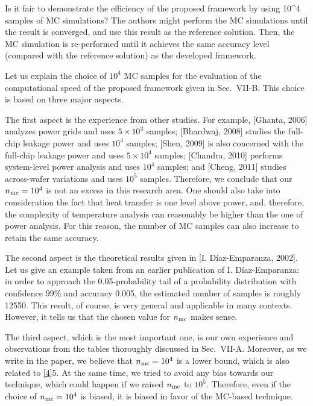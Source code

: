 \begin{reviewer}
Is it fair to demonstrate the efficiency of the proposed framework by using 10\^{}4 samples of MC simulations? The authors might perform the MC simulations until the result is converged, and use this result as the reference solution. Then, the MC simulation is re-performed until it achieves the same accuracy level (compared with the reference solution) as the developed framework.
\end{reviewer}
\begin{authors}
Let us explain the choice of $10^4$ MC samples for the evaluation of the computational speed of the proposed framework given in Sec.~VII-B.
This choice is based on three major aspects.

The first aspect is the experience from other studies.
For example, [Ghanta, 2006] analyzes power grids and uses $5 \times 10^3$ samples; [Bhardwaj, 2008] studies the full-chip leakage power and uses $10^4$ samples; [Shen, 2009] is also concerned with the full-chip leakage power and uses $5 \times 10^4$ samples; [Chandra, 2010] performs system-level power analysis and uses $10^4$ samples; and [Cheng, 2011] studies across-wafer variations and uses $10^5$ samples.
Therefore, we conclude that our ${n_\text{mc}} = 10^4$ is not an excess in this research area.
One should also take into consideration the fact that heat transfer is one level above power, and, therefore, the complexity of temperature analysis can reasonably be higher than the one of power analysis.
For this reason, the number of MC samples can also increase to retain the same accuracy.

The second aspect is the theoretical results given in [I. D\'{i}az-Emparanza, 2002].
Let us give an example taken from an earlier publication of I. D\'{i}az-Emparanza: in order to approach the 0.05-probability tail of a probability distribution with confidence 99\% and accuracy 0.005, the estimated number of samples is roughly 12550.
This result, of course, is very general and applicable in many contexts.
However, it tells us that the chosen value for ${n_\text{mc}}$ makes sense.

The third aspect, which is the most important one, is our own experience and observations from the tables thoroughly discussed in Sec.~VII-A.
Moreover, as we write in the paper, we believe that ${n_\text{mc}} = 10^4$ is a lower bound, which is also related to \cref{4}{5}.
At the same time, we tried to avoid any bias towards our technique, which could happen if we raised ${n_\text{mc}}$ to $10^5$.
Therefore, even if the choice of ${n_\text{mc}} = 10^4$ is biased, it is biased in favor of the MC-based technique.


\end{authors}
